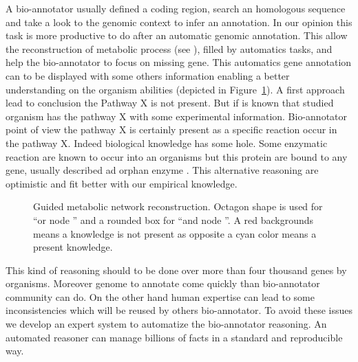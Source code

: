 \documentclass{llncs}
\begin{document}
A bio-annotator usually defined a coding region, search an homologous sequence and take a look to the genomic context to infer an annotation. In our opinion this task is more productive to do after an automatic genomic annotation. This allow the reconstruction of metabolic process (see \cite{francke2005reconstructing}), filled by automatics tasks, and help the bio-annotator to focus on missing gene. This automatics gene annotation can to be displayed with some others information
enabling a better understanding on the organism abilities (depicted in Figure~\ref{fig:metabolicNetworkReconstruction}). A first approach lead to conclusion the Pathway X is not present. But if is known that studied organism has the pathway X with some experimental information. Bio-annotator point of view the pathway X is certainly present as a specific reaction occur in the pathway X. Indeed biological knowledge has some hole. Some enzymatic reaction are known to occur into an  organisms but this protein are bound to any gene, usually described ad orphan enzyme \cite{sorokina2014profiling}. This alternative reasoning are optimistic and fit better with our empirical knowledge.

\begin{figure}
    \centering
    \def\svgwidth{\columnwidth}
    
    \caption{Guided metabolic network reconstruction. Octagon shape is used for ``or node '' and a rounded box for ``and node ''. A red backgrounds means a knowledge is not present as opposite a cyan color means a present knowledge. }
    \label{fig:metabolicNetworkReconstruction}
\end{figure}

This kind of reasoning should to be done over more than four thousand genes by organisms. Moreover genome to annotate come quickly than bio-annotator community can do. On the other hand human expertise can lead to some inconsistencies which will be reused by others bio-annotator. To avoid these issues we develop an expert system to automatize the bio-annotator reasoning. An automated reasoner can manage billions of facts in a standard and reproducible way.
\end{document}
